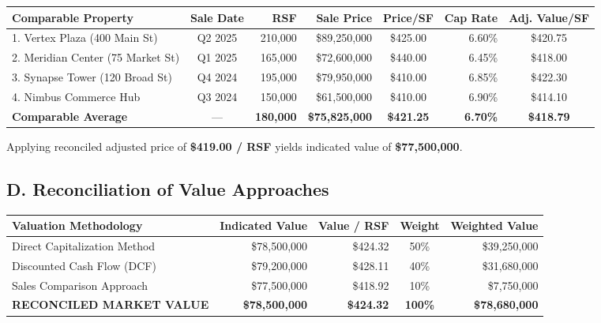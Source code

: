 \documentclass[10pt,a4paper]{scrartcl}
\begin{document}
\begin{center}
\tiny
{}
\begin{tabularx}{\textwidth}{@{} l c r r c r c @{}}
\toprule
\rowcolor{navyprimary}
{\color{white}\textbf{Comparable Property}} & {\color{white}\textbf{Sale Date}} & {\color{white}\textbf{RSF}} & {\color{white}\textbf{Sale Price}} & {\color{white}\textbf{Price/SF}} & {\color{white}\textbf{Cap Rate}} & {\color{white}\textbf{Adj. Value/SF}} \\
\midrule
1. Vertex Plaza (400 Main St) & Q2 2025 & 210,000 & \$89,250,000 & \$425.00 & 6.60\% & \$420.75 \\
2. Meridian Center (75 Market St) & Q1 2025 & 165,000 & \$72,600,000 & \$440.00 & 6.45\% & \$418.00 \\
3. Synapse Tower (120 Broad St) & Q4 2024 & 195,000 & \$79,950,000 & \$410.00 & 6.85\% & \$422.30 \\
4. Nimbus Commerce Hub & Q3 2024 & 150,000 & \$61,500,000 & \$410.00 & 6.90\% & \$414.10 \\
\midrule
\rowcolor{cardbg}
\textbf{Comparable Average} & --- & \textbf{180,000} & \textbf{\$75,825,000} & \textbf{\$421.25} & \textbf{6.70\%} & \textbf{\$418.79} \\
\bottomrule
\end{tabularx}
\end{center}

\vspace{-4pt}
Applying reconciled adjusted price of \textbf{\$419.00 / RSF} yields indicated value of \textbf{\$77,500,000}.

\vspace{1pt}
\subsection*{D. Reconciliation of Value Approaches}

\begin{center}
\tiny
{}
\begin{tabularx}{\textwidth}{@{} L r r c r @{}}
\toprule
{}
{\color{white}\textbf{Valuation Methodology}} & {\color{white}\textbf{Indicated Value}} & {\color{white}\textbf{Value / RSF}} & {\color{white}\textbf{Weight}} & {\color{white}\textbf{Weighted Value}} \\
\midrule
Direct Capitalization Method & \$78,500,000 & \$424.32 & 50\% & \$39,250,000 \\
Discounted Cash Flow (DCF) & \$79,200,000 & \$428.11 & 40\% & \$31,680,000 \\
Sales Comparison Approach & \$77,500,000 & \$418.92 & 10\% & \$7,750,000 \\
\midrule
{}
{\color{white}\textbf{RECONCILED MARKET VALUE}} & {\color{white}\textbf{\$78,500,000}} & {\color{white}\textbf{\$424.32}} & {\color{white}\textbf{100\%}} & {\color{white}\textbf{\$78,680,000}} \\
\bottomrule
\end{tabularx}
\end{center}
\end{document}
